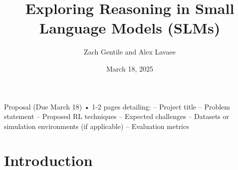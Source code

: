 \documentclass[11pt, oneside]{article}   	%
\title{Exploring Reasoning in Small Language Models (SLMs)}
\author{Zach Gentile and Alex Lavaee}
\date{March 18, 2025}
\begin{document}
\maketitle

Proposal (Due March 18)
• 1-2 pages detailing:
– Project title
– Problem statement
– Proposed RL techniques
– Expected challenges
– Datasets or simulation environments (if applicable)
– Evaluation metrics

\section*{Introduction}

\printbibliography
\end{document}
